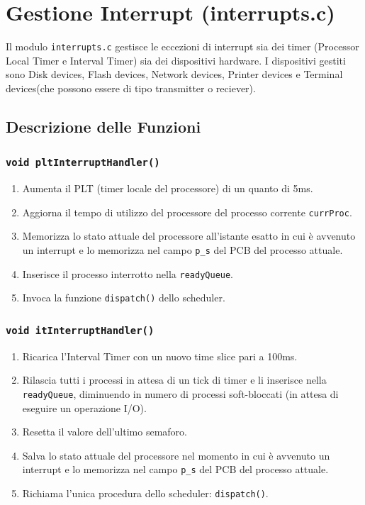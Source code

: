 \documentclass[a4paper,12pt]{article}
\begin{document}
\section{Gestione Interrupt (interrupts.c)}
Il modulo \texttt{interrupts.c} gestisce le eccezioni di interrupt sia dei timer (Processor Local Timer e Interval Timer) sia dei dispositivi hardware. I dispositivi gestiti sono Disk devices, Flash devices, Network devices, Printer devices e Terminal devices(che possono essere di tipo transmitter o reciever).

\vspace{0.5cm}
\subsection{Descrizione delle Funzioni}

\subsubsection{\texttt{void pltInterruptHandler()}}
\begin{enumerate}
    \item Aumenta il PLT (timer locale del processore) di un quanto di 5ms.
    \item Aggiorna il tempo di utilizzo del processore del processo corrente \texttt{currProc}.
    \item Memorizza lo stato attuale del processore all'istante esatto in cui è avvenuto un interrupt e lo memorizza nel campo \texttt{p\_s} del PCB del processo attuale.
    \item Inserisce il processo interrotto nella \texttt{readyQueue}.
    \item Invoca la funzione \texttt{dispatch()} dello scheduler. 
\end{enumerate}

\subsubsection{\texttt{void itInterruptHandler()}}
\begin{enumerate}
    \item Ricarica l'Interval Timer con un nuovo time slice pari a 100ms.
    \item Rilascia tutti i processi in attesa di un tick di timer e li inserisce nella \texttt{readyQueue}, diminuendo in numero di processi soft-bloccati (in attesa di eseguire un operazione I/O).
    \item Resetta il valore dell'ultimo semaforo.
    \item Salva lo stato attuale del processore nel momento in cui è avvenuto un interrupt e lo memorizza nel campo \texttt{p\_s} del PCB del processo attuale.
    \item Richiama l'unica procedura dello scheduler: \texttt{dispatch()}. 
\end{enumerate}
\end{document}

